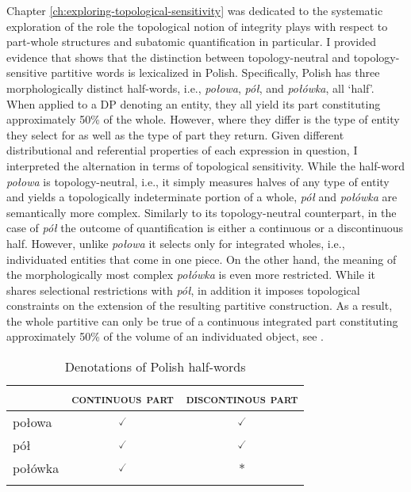 Chapter \ref{ch:exploring-topological-sensitivity} was dedicated to the systematic exploration of the role the topological notion of integrity plays with respect to part-whole structures and subatomic quantification in particular. I provided evidence that shows that the distinction between topology-neutral and topology-sensitive partitive words is lexicalized in Polish. Specifically, Polish has three morphologically distinct half-words, i.e., \textit{połowa}, \textit{pół}, and \textit{połówka}, all `half'. When applied to a DP denoting an entity, they all yield its part constituting approximately 50\% of the whole. However, where they differ is the type of entity they select for as well as the type of part they return. Given different distributional and referential properties of each expression in question, I interpreted the alternation in terms of topological sensitivity. While the half-word \textit{połowa} is topology-neutral, i.e., it simply measures halves of any type of entity and yields a topologically indeterminate portion of a whole, \textit{pół} and \textit{połówka} are semantically more complex. Similarly to its topology-neutral counterpart, in the case of \textit{pół} the outcome of quantification is either a continuous or a discontinuous half. However, unlike \textit{połowa} it selects only for integrated wholes, i.e., individuated entities that come in one piece. On the other hand, the meaning of the morphologically most complex \textit{połówka} is even more restricted. While it shares selectional restrictions with \textit{pół}, in addition it imposes topological constraints on the extension of the resulting partitive construction. As a result, the whole partitive can only be true of a continuous integrated part constituting approximately 50\% of the volume of an individuated object, see .

\begin{table}[h!]
			\centering
			\begin{tabular}{lcc}
				\lsptoprule
				& \textsc{continuous part} & \textsc{discontinous part} \\ \midrule
				połowa  & $\checked$    & $\checked$      \\
				pół     & $\checked$    & $\checked$      \\
				połówka & $\checked$    & *                 \\ \lspbottomrule
			\end{tabular}
			\caption{Denotations of Polish half-words}\label{tab:denotations-of-polish-half-words2}
		\end{table}

